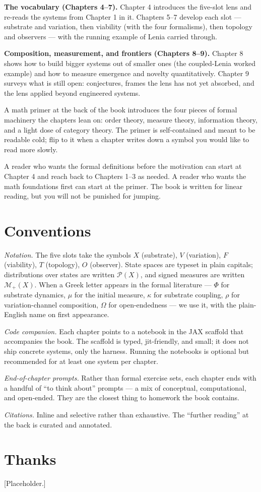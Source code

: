 \textbf{The vocabulary (Chapters 4--7).} Chapter 4 introduces the
five-slot lens and re-reads the systems from Chapter 1 in it. Chapters
5--7 develop each slot --- substrate and variation, then viability
(with the four formalisms), then topology and observers --- with the
running example of Lenia carried through.

\textbf{Composition, measurement, and frontiers (Chapters 8--9).}
Chapter 8 shows how to build bigger systems out of smaller ones (the
coupled-Lenia worked example) and how to measure emergence and novelty
quantitatively. Chapter 9 surveys what is still open: conjectures,
frames the lens has not yet absorbed, and the lens applied beyond
engineered systems.

A math primer at the back of the book introduces the four pieces of
formal machinery the chapters lean on: order theory, measure theory,
information theory, and a light dose of category theory. The primer
is self-contained and meant to be readable cold; flip to it when a
chapter writes down a symbol you would like to read more slowly.

A reader who wants the formal definitions before the motivation can
start at Chapter 4 and reach back to Chapters 1--3 as needed. A
reader who wants the math foundations first can start at the primer.
The book is written for linear reading, but you will not be punished
for jumping.

\section*{Conventions}

\textit{Notation.} The five slots take the symbols $X$ (substrate),
$V$ (variation), $F$ (viability), $T$ (topology), $O$ (observer). State
spaces are typeset in plain capitals; distributions over states are
written $\mathcal{P}(X)$, and signed measures are written
$\mathcal{M}_{+}(X)$. When a Greek letter appears in the formal
literature --- $\Phi$ for substrate dynamics, $\mu$ for the initial
measure, $\kappa$ for substrate coupling, $\rho$ for variation-channel
composition, $\Omega$ for open-endedness --- we use it, with the
plain-English name on first appearance.

\textit{Code companion.} Each chapter points to a notebook in the JAX
scaffold that accompanies the book. The scaffold is typed,
jit-friendly, and small; it does not ship concrete systems, only the
harness. Running the notebooks is optional but recommended for at
least one system per chapter.

\textit{End-of-chapter prompts.} Rather than formal exercise sets, each
chapter ends with a handful of ``to think about'' prompts --- a mix of
conceptual, computational, and open-ended. They are the closest thing
to homework the book contains.

\textit{Citations.} Inline and selective rather than exhaustive. The
``further reading'' at the back is curated and annotated.

\section*{Thanks}

[Placeholder.]
